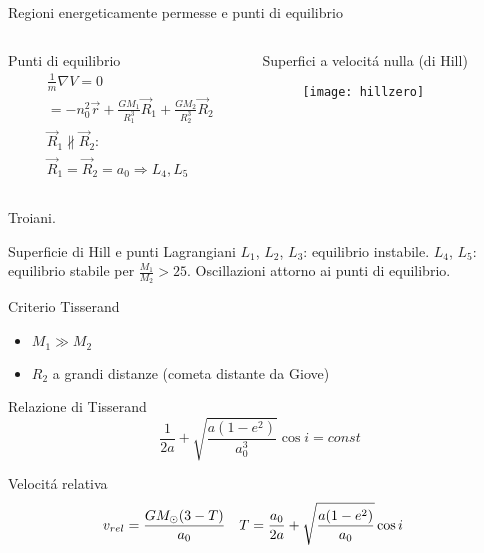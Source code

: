 \begin{frame}{Regioni energeticamente permesse e punti di equilibrio}
\begin{columns}
\begin{column}{0.43\textwidth}
\begin{block}{Punti di equilibrio}
\begin{align*}
&\frac{1}{m}\nabla V=0\\
&=-n_0^2\vec{r}+\frac{GM_1}{R_1^3}\vec{R}_1+\frac{GM_2}{R_2^3}\vec{R}_2\\
&\vec{R}_1\nparallel\vec{R}_2:\\
&\vec{R}_1=\vec{R}_2=a_0 \Rightarrow L_4, L_5
\end{align*}
\end{block}
\end{column}
\begin{column}{0.57\textwidth}
\begin{block}{Superfici a velocit\'a nulla (di Hill)}
\begin{figure}[!t]
\texttt{[image: hillzero]}
\end{figure}
\end{block}
\end{column}
\end{columns}
Troiani.
\end{frame}

\begin{wordonframe}{Superficie di Hill e punti Lagrangiani}
$L_1$, $L_2$, $L_3$: equilibrio instabile.
$L_4$, $L_5$: equilibrio stabile per $\frac{M_1}{M_2}>25$.
Oscillazioni attorno ai punti di equilibrio.
\end{wordonframe}

\begin{frame}{Criterio Tisserand}
\begin{itemize}
\item $M_1\gg M_2$
\item $R_2$ a grandi distanze (cometa distante da Giove)
\end{itemize}
\begin{block}{Relazione di Tisserand}
\begin{equation*}
\frac{1}{2a}+\sqrt{\frac{a(1-e^2)}{a_0^3}}\cos{i}=const
\end{equation*}
\end{block}
\begin{block}{Velocit\'a relativa}
\begin{align*}
&v_{rel}=\frac{GM_{\odot}{}(3-T)}{a_0}\quad T=\frac{a_0}{2a}+\sqrt{\frac{a(1-e^2)}{a_0}}\cos{i}
\end{align*}
\end{block}
\end{frame}

